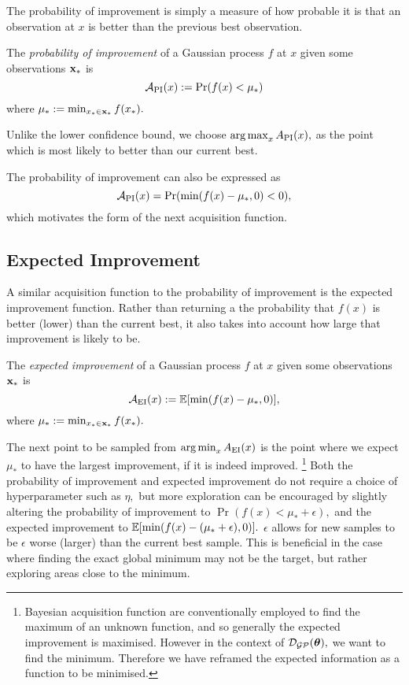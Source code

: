 The probability of improvement is simply a measure of how probable it is that
an observation at $x$ is better than the previous best observation.

\begin{definition}
    The \emph{probability of improvement} of a Gaussian process $f$ at $x$ given
    some observations $\mathbf{x}_*$ is
    $$
        \mathcal{A}_\mathrm{PI}(x) := \Pr(f(x) < \mu_*)
    $$
    where $\mu_* := \min_{x_*\in\mathbf{x}_*}f(x_*).$
\end{definition}

Unlike the lower confidence bound, we choose $\operatorname*{arg\,max}_{x} A_\mathrm{PI}(x),$ as
the point which is most likely to better than our current best.

The probability of improvement can also be expressed as
$$
    \mathcal{A}_\mathrm{PI}(x) = \Pr(\min(f(x) - \mu_*, 0) < 0),
$$
which motivates the form of the next acquisition function.

\subsection*{Expected Improvement}

A similar acquisition function to the probability of improvement is the expected
improvement function. Rather than returning a the probability that $f(x)$ is
better (lower) than the current best, it also takes into account how large that
improvement is likely to be.

\begin{definition}
    The \emph{expected improvement} of a Gaussian process $f$ at $x$ given
    some observations $\mathbf{x}_*$ is
    $$
        \mathcal{A}_{\mathrm{EI}}(x)
        := \operatorname{\mathbb{E}}[\min(f(x) - \mu_*, 0)],
    $$ where $\mu_* := \min_{x_*\in\mathbf{x}_*}f(x_*).$
\end{definition}
The next point to be sampled from $\operatorname*{arg\,min}_{x} A_{\mathrm{EI}}(x)$ is the point
where we expect $\mu_*$ to have the largest improvement, if it is indeed
improved.
\footnote{
    Bayesian acquisition function are
    conventionally employed to find the maximum of an unknown function,
    and so generally the expected improvement is maximised.
    However in the context of $\mathcal{D}_{\mathcal{GP}}(\bm{\theta}),$ we want to find the minimum.
    Therefore we have reframed the expected information 
    as a function to be minimised.
}
Both the probability of improvement and
expected improvement do not require a
choice of hyperparameter such as $\eta,$ but more exploration can be
encouraged by slightly altering the probability of improvement to
$\Pr(f(x) < \mu_* + \epsilon),$ and the expected improvement to
$\operatorname{\mathbb{E}}[\min(f(x) - (\mu_* + \epsilon), 0)].$ $\epsilon$ allows for
new samples to be $\epsilon$ worse (larger) than the current best sample.
This is beneficial in the case where finding the exact global minimum may not
be the target, but rather exploring areas close to the minimum.



